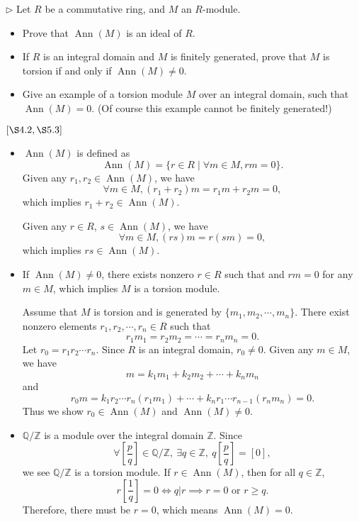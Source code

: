 \begin{problem}[4.4]
$\triangleright$ Let $R$ be a commutative ring, and $M$ an $R$-module.
\begin{itemize}
	\item Prove that $\operatorname{Ann}(M)$ is an ideal of $R$.
	\item If $R$ is an integral domain and $M$ is finitely generated, prove that $M$ is torsion if and only if $\operatorname{Ann}(M) \neq 0$.
	\item Give an example of a torsion module $M$ over an integral domain, such that $\operatorname{Ann}(M)=0 .$ (Of course this example cannot be finitely generated!)
\end{itemize}
$[\S 4.2, \S 5.3]$
\end{problem}
\begin{solution}
\begin{itemize}
	\item $\operatorname{Ann}(M)$ is defined as
	\[
	\operatorname{Ann}(M)=\{r \in R \mid \forall m \in M, r m=0\}.
	\]
	Given any $r_1,r_2\in\operatorname{Ann}(M)$, we have 
	\[
	\forall m\in M, (r_1+r_2)m=r_1m+r_2m=0,
	\]
	which implies $r_1+r_2\in\operatorname{Ann}(M)$.
	
	Given any $r\in R$, $s\in\operatorname{Ann}(M)$, we have
	\[
	\forall m\in M, (rs)m=r(sm)=0,
	\]
	which implies $rs\in\operatorname{Ann}(M)$.
	\item If $\operatorname{Ann}(M) \neq 0$, there exists nonzero $r\in R$ such that and $rm=0$ for any $m\in M$, which implies $M$ is a torsion module.
	
	Assume that $M$ is torsion and is generated by $\{m_1,m_2,\cdots,m_n\}$. There exist nonzero elements $r_1,r_2,\cdots,r_n\in R$ such that
	\[
	r_1m_1=r_2m_2=\cdots=r_nm_n=0.
	\]
	Let $r_0=r_1r_2\cdots r_n$. Since $R$ is an integral domain, $r_0\ne0$. Given any $m\in M$, we have
	\[
	m=k_1m_1+k_2m_2+\cdots+k_nm_n
	\]
	and
	\[
	r_0m=k_1r_2\cdots r_n(r_1m_1)+\cdots+k_nr_1\cdots r_{n-1} (r_nm_n)=0.
	\]
	Thus we show $r_0\in\operatorname{Ann}(M)$ and $\operatorname{Ann}(M)\ne0$.
	\item $\mathbb{Q}/\mathbb{Z}$ is a module over the integral domain $\mathbb{Z}$. Since
	\[
	\forall \left[\frac{p}{q}\right]\in \mathbb{Q}/\mathbb{Z},\ \exists q\in\mathbb{Z},\ q\left[\frac{p}{q}\right]=[0],
	\]
	we see $\mathbb{Q}/\mathbb{Z}$ is a torsion module. If $r\in\operatorname{Ann}(M)$, then for all $q\in\mathbb{Z}$,
	\[
	r\left[\frac{1}{q}\right]=0\iff q|r\implies r=0\text{ or } r\ge q.
	\]
	Therefore, there must be $r=0$, which means $\operatorname{Ann}(M)=0$.
	
\end{itemize}
\end{solution}
